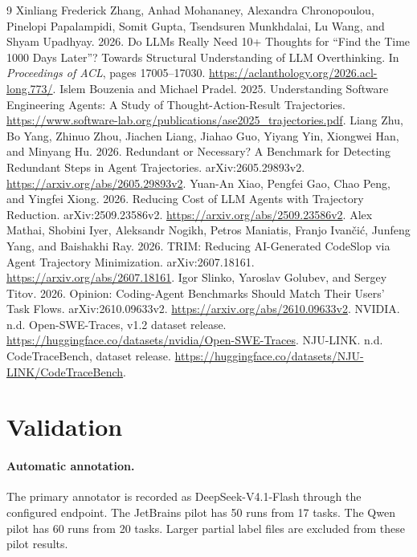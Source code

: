 \documentclass[10pt,a4paper,twocolumn]{article}
\begin{document}
\begin{thebibliography}{9}
\small
{}
Xinliang Frederick Zhang, Anhad Mohananey, Alexandra Chronopoulou, Pinelopi Papalampidi, Somit Gupta, Tsendsuren Munkhdalai, Lu Wang, and Shyam Upadhyay. 2026.
\newblock Do LLMs Really Need 10+ Thoughts for ``Find the Time 1000 Days Later''? Towards Structural Understanding of LLM Overthinking.
\newblock In \emph{Proceedings of ACL}, pages 17005--17030. \url{https://aclanthology.org/2026.acl-long.773/}.
Islem Bouzenia and Michael Pradel. 2025.
\newblock Understanding Software Engineering Agents: A Study of Thought-Action-Result Trajectories.
\newblock \url{https://www.software-lab.org/publications/ase2025_trajectories.pdf}.
Liang Zhu, Bo Yang, Zhinuo Zhou, Jiachen Liang, Jiahao Guo, Yiyang Yin, Xiongwei Han, and Minyang Hu. 2026.
\newblock Redundant or Necessary? A Benchmark for Detecting Redundant Steps in Agent Trajectories.
\newblock arXiv:2605.29893v2. \url{https://arxiv.org/abs/2605.29893v2}.
Yuan-An Xiao, Pengfei Gao, Chao Peng, and Yingfei Xiong. 2026.
\newblock Reducing Cost of LLM Agents with Trajectory Reduction.
\newblock arXiv:2509.23586v2. \url{https://arxiv.org/abs/2509.23586v2}.
Alex Mathai, Shobini Iyer, Aleksandr Nogikh, Petros Maniatis, Franjo Ivan\v{c}i\'{c}, Junfeng Yang, and Baishakhi Ray. 2026.
\newblock TRIM: Reducing AI-Generated CodeSlop via Agent Trajectory Minimization.
\newblock arXiv:2607.18161. \url{https://arxiv.org/abs/2607.18161}.
Igor Slinko, Yaroslav Golubev, and Sergey Titov. 2026.
\newblock Opinion: Coding-Agent Benchmarks Should Match Their Users' Task Flows.
\newblock arXiv:2610.09633v2. \url{https://arxiv.org/abs/2610.09633v2}.
NVIDIA. n.d. Open-SWE-Traces, v1.2 dataset release.
\newblock \url{https://huggingface.co/datasets/nvidia/Open-SWE-Traces}.
NJU-LINK. n.d. CodeTraceBench, dataset release.
\newblock \url{https://huggingface.co/datasets/NJU-LINK/CodeTraceBench}.
\end{thebibliography}

\appendix
\section{Validation}\label{app:validation}
\paragraph{Automatic annotation.}
The primary annotator is recorded as DeepSeek-V4.1-Flash through the configured endpoint. The JetBrains pilot has 50 runs from 17 tasks. The Qwen pilot has 60 runs from 20 tasks. Larger partial label files are excluded from these pilot results.
\end{document}

